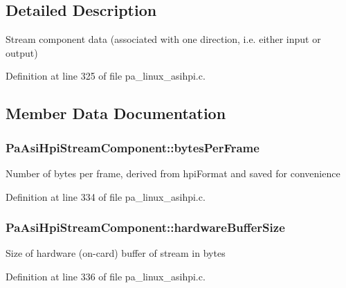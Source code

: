\subsection{Detailed Description}
Stream component data (associated with one direction, i.\+e. either input or output) 

Definition at line 325 of file pa\+\_\+linux\+\_\+asihpi.\+c.



\subsection{Member Data Documentation}
\subsubsection[{\texorpdfstring{bytes\+Per\+Frame}{bytesPerFrame}}]{ Pa\+Asi\+Hpi\+Stream\+Component\+::bytes\+Per\+Frame}\hypertarget{struct_pa_asi_hpi_stream_component_afa3f30d67315cd9fd127f4141d087dc0}{}\label{struct_pa_asi_hpi_stream_component_afa3f30d67315cd9fd127f4141d087dc0}
Number of bytes per frame, derived from hpi\+Format and saved for convenience 

Definition at line 334 of file pa\+\_\+linux\+\_\+asihpi.\+c.

\subsubsection[{\texorpdfstring{hardware\+Buffer\+Size}{hardwareBufferSize}}]{ Pa\+Asi\+Hpi\+Stream\+Component\+::hardware\+Buffer\+Size}\hypertarget{struct_pa_asi_hpi_stream_component_aaee8d45f2dd21ee33afeb9a8efda119e}{}\label{struct_pa_asi_hpi_stream_component_aaee8d45f2dd21ee33afeb9a8efda119e}
Size of hardware (on-\/card) buffer of stream in bytes 

Definition at line 336 of file pa\+\_\+linux\+\_\+asihpi.\+c.

